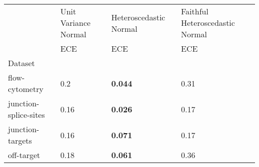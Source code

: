 \begin{tabular}{l|l|l|l}
\toprule
 & Unit Variance Normal & Heteroscedastic Normal & Faithful Heteroscedastic Normal \\
 & ECE & ECE & ECE \\
Dataset &  &  &  \\
\midrule
flow-cytometry & 0.2 & \bfseries 0.044 & 0.31 \\
junction-splice-sites & 0.16 & \bfseries 0.026 & 0.17 \\
junction-targets & 0.16 & \bfseries 0.071 & 0.17 \\
off-target & 0.18 & \bfseries 0.061 & 0.36 \\
\bottomrule
\end{tabular}
